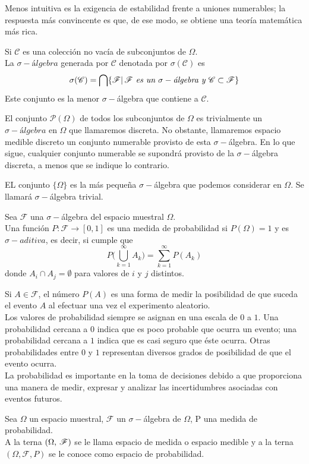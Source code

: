 Menos intuitiva es la exigencia de estabilidad frente a uniones numerables; la respuesta más
convincente es que, de ese modo, se obtiene una teoría matemática más rica.
\begin{Def}
    Si $\mathscr{C}$ es una colección no vacía de subconjuntos de $\Omega$.\\La $\sigma-\textit{álgebra}$ generada por $\mathscr{C}$ denotada por $\sigma(\mathscr{C})$ es $$\sigma(\mathscr{C})=\bigcap\{\mathscr{F}|\thinspace\mathscr{F} \textit{ es un }\sigma-\textit{álgebra y }  \mathscr{C}\subset\mathscr{F}\}$$
    Este conjunto es la menor $\sigma-$álgebra que contiene a $\mathscr{C}$.
\end{Def}
\begin{Ejm}
    El conjunto $\mathscr{P}(\Omega)$ de todos los subconjuntos de $\Omega$ es trivialmente un $\sigma-álgebra$ en $\Omega$ que llamaremos discreta. No obstante, llamaremos espacio medible discreto un conjunto numerable provisto de esta $\sigma-$álgebra. En lo que sigue, cualquier conjunto numerable se supondrá provisto de la $\sigma-$álgebra discreta, a menos que se indique lo contrario.
\end{Ejm}
\begin{Ejm}
    EL conjunto $\{\Omega\}$ es la más pequeña $\sigma-$álgebra que podemos considerar en $\Omega$. Se llamará $\sigma-$álgebra trivial.
\end{Ejm}
\begin{Def}
    \label{def-medidaProbabilidad}
    Sea $\mathscr{F}$ una $\sigma-$álgebra del espacio muestral $\Omega$.\\
    Una función $P:\mathscr{F}\rightarrow [0,1]$ es una medida de probabilidad si $P(\Omega)=1$ y es $\sigma-aditiva$, es decir, si cumple que $$P\big(\bigcup_{k=1}^\infty A_k\big)=\sum_{k=1}^\infty P(A_k)$$
    donde $A_i\cap A_j=\emptyset$ para valores de $i$ y $j$ distintos.
\end{Def}
Si $A\in\mathscr{F}$, el número $P(A)$ es una forma de medir la posibilidad de que suceda el evento $A$ al efectuar una vez el experimento aleatorio.\\
Los valores de probabilidad siempre se asignan en una escala de $0$ a $1$. Una probabilidad cercana a $0$ indica que es poco probable que ocurra un evento; una probabilidad cercana a $1$ indica que es casi seguro que éste ocurra. Otras probabilidades entre $0$ y $1$ representan diversos grados de posibilidad de que el evento ocurra.\\
La probabilidad es importante en la toma de decisiones debido a que proporciona una manera de medir, expresar y analizar las incertidumbres asociadas con eventos futuros.
\begin{Def}
    Sea $\Omega$ un espacio muestral, $\mathscr{F}$ un $\sigma-$álgebra de $\Omega$, P una medida de probabilidad.\\
    A la terna $(\Omega,\thinspace\mathscr{F})$ se le llama espacio de medida o espacio medible y a la terna $(\Omega,\mathscr{F},P)$ se le conoce como espacio de probabilidad.
\end{Def}